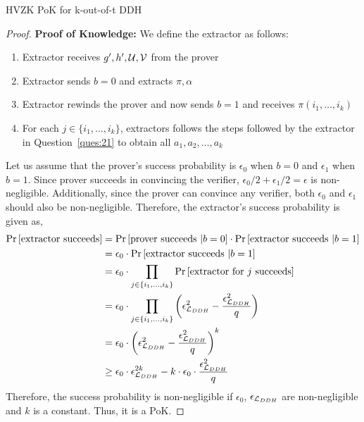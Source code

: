 \begin{solution}{HVZK PoK for k-out-of-t DDH}
\begin{proof}
        \textbf{Proof of Knowledge:} We define the extractor as follows:
        \begin{enumerate}
            \item Extractor receives $g', h', \mathcal{U}, \mathcal{V}$ from the prover
            \item Extractor sends $b = 0$ and extracts $\pi, \alpha$
            \item Extractor rewinds the prover and now sends $b = 1$ and receives $\pi(i_1, \ldots, i_k)$
            \item For each $j \in \{i_1, \ldots, i_k\}$, extractors follows the steps followed by the extractor in Question~\ref{ques:21} to obtain all $a_1, a_2, \ldots, a_k$
        \end{enumerate}
        Let us assume that the prover's success probability is $\epsilon_0$ when $b = 0$ and $\epsilon_1$ when $b = 1$. Since prover succeeds in convincing the verifier, $\epsilon_0/2 + \epsilon_1/2 = \epsilon$ is non-negligible. Additionally, since the prover can convince any verifier, both $\epsilon_0$ and $\epsilon_1$ should also be non-negligible. Therefore, the extractor's success probability is given as,
        \begin{equation}
            \begin{split}
                \Pr\left[ \text{extractor succeeds} \right] &= \Pr\left[ \text{prover succeeds }|b = 0 \right]\cdot\Pr\left[ \text{extractor succeeds }|b = 1 \right]\\
                                                 &= \epsilon_0\cdot \Pr\left[ \text{extractor succeeds } | b = 1 \right]\\
                                                 &= \epsilon_0\cdot \prod_{j\in\{i_1, \ldots, i_k\}}\Pr\left[ \text{extractor for }j\text{ succeeds} \right]\\
                                                 &= \epsilon_0\cdot \prod_{j\in\{i_1, \ldots, i_k\}}\left(\epsilon_{\mathcal{L}_{DDH}}^2 - \frac{\epsilon_{\mathcal{L}_{DDH}}^2}{q}\right)\\
                                                 &= \epsilon_0\cdot \left(\epsilon_{\mathcal{L}_{DDH}}^2 - \frac{\epsilon_{\mathcal{L}_{DDH}}^2}{q}\right)^k\\
                                                 &\geq \epsilon_0\cdot \epsilon_{\mathcal{L}_{DDH}}^{2k} - k\cdot \epsilon_0\cdot\frac{\epsilon_{\mathcal{L}_{DDH}}^2}{q}
            \end{split}
        \end{equation}
        Therefore, the success probability is non-negligible if $\epsilon_0$, $\epsilon_{\mathcal{L}_{DDH}}$ are non-negligible and $k$ is a constant. Thus, it is a PoK.


\end{proof}
\end{solution}
